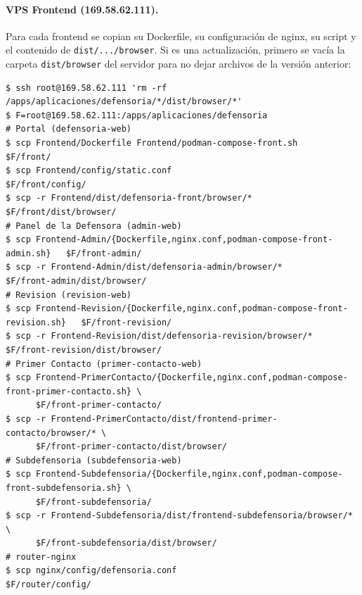 \paragraph{VPS Frontend (169.58.62.111).} Para cada frontend se copian su Dockerfile, su configuración de nginx, su script y el contenido de \texttt{dist/.../browser}. Si es una actualización, primero se vacía la carpeta \texttt{dist/browser} del servidor para no dejar archivos de la versión anterior:
\begin{lstlisting}
$ ssh root@169.58.62.111 'rm -rf /apps/aplicaciones/defensoria/*/dist/browser/*'
$ F=root@169.58.62.111:/apps/aplicaciones/defensoria
# Portal (defensoria-web)
$ scp Frontend/Dockerfile Frontend/podman-compose-front.sh      $F/front/
$ scp Frontend/config/static.conf                               $F/front/config/
$ scp -r Frontend/dist/defensoria-front/browser/*               $F/front/dist/browser/
# Panel de la Defensora (admin-web)
$ scp Frontend-Admin/{Dockerfile,nginx.conf,podman-compose-front-admin.sh}   $F/front-admin/
$ scp -r Frontend-Admin/dist/defensoria-admin/browser/*         $F/front-admin/dist/browser/
# Revision (revision-web)
$ scp Frontend-Revision/{Dockerfile,nginx.conf,podman-compose-front-revision.sh}   $F/front-revision/
$ scp -r Frontend-Revision/dist/defensoria-revision/browser/*   $F/front-revision/dist/browser/
# Primer Contacto (primer-contacto-web)
$ scp Frontend-PrimerContacto/{Dockerfile,nginx.conf,podman-compose-front-primer-contacto.sh} \
      $F/front-primer-contacto/
$ scp -r Frontend-PrimerContacto/dist/frontend-primer-contacto/browser/* \
      $F/front-primer-contacto/dist/browser/
# Subdefensoria (subdefensoria-web)
$ scp Frontend-Subdefensoria/{Dockerfile,nginx.conf,podman-compose-front-subdefensoria.sh} \
      $F/front-subdefensoria/
$ scp -r Frontend-Subdefensoria/dist/frontend-subdefensoria/browser/* \
      $F/front-subdefensoria/dist/browser/
# router-nginx
$ scp nginx/config/defensoria.conf                              $F/router/config/
\end{lstlisting}

